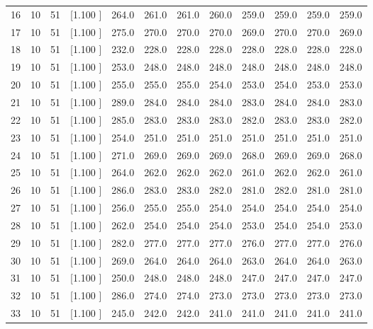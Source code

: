 \documentclass[12pt,a4paper]{article}
\begin{document}
\begin{center}
{\begin{tabular}{r r r r r r r r r r r r}
  16& 10& 51&[1.100     ]&   264.0&   261.0&   261.0&   260.0&   259.0&   259.0&   259.0&   259.0\\[-0.02in]
  17& 10& 51&[1.100     ]&   275.0&   270.0&   270.0&   270.0&   269.0&   270.0&   270.0&   269.0\\[-0.02in]
  18& 10& 51&[1.100     ]&   232.0&   228.0&   228.0&   228.0&   228.0&   228.0&   228.0&   228.0\\[-0.02in]
  19& 10& 51&[1.100     ]&   253.0&   248.0&   248.0&   248.0&   248.0&   248.0&   248.0&   248.0\\[-0.02in]
  20& 10& 51&[1.100     ]&   255.0&   255.0&   255.0&   254.0&   253.0&   254.0&   253.0&   253.0\\[-0.02in]
  21& 10& 51&[1.100     ]&   289.0&   284.0&   284.0&   284.0&   283.0&   284.0&   284.0&   283.0\\[-0.02in]
  22& 10& 51&[1.100     ]&   285.0&   283.0&   283.0&   283.0&   282.0&   283.0&   283.0&   282.0\\[-0.02in]
  23& 10& 51&[1.100     ]&   254.0&   251.0&   251.0&   251.0&   251.0&   251.0&   251.0&   251.0\\[-0.02in]
  24& 10& 51&[1.100     ]&   271.0&   269.0&   269.0&   269.0&   268.0&   269.0&   269.0&   268.0\\[-0.02in]
  25& 10& 51&[1.100     ]&   264.0&   262.0&   262.0&   262.0&   261.0&   262.0&   262.0&   261.0\\[-0.02in]
  26& 10& 51&[1.100     ]&   286.0&   283.0&   283.0&   282.0&   281.0&   282.0&   281.0&   281.0\\[-0.02in]
  27& 10& 51&[1.100     ]&   256.0&   255.0&   255.0&   254.0&   254.0&   254.0&   254.0&   254.0\\[-0.02in]
  28& 10& 51&[1.100     ]&   262.0&   254.0&   254.0&   254.0&   253.0&   254.0&   254.0&   253.0\\[-0.02in]
  29& 10& 51&[1.100     ]&   282.0&   277.0&   277.0&   277.0&   276.0&   277.0&   277.0&   276.0\\[-0.02in]
  30& 10& 51&[1.100     ]&   269.0&   264.0&   264.0&   264.0&   263.0&   264.0&   264.0&   263.0\\[-0.02in]
  31& 10& 51&[1.100     ]&   250.0&   248.0&   248.0&   248.0&   247.0&   247.0&   247.0&   247.0\\[-0.02in]
  32& 10& 51&[1.100     ]&   286.0&   274.0&   274.0&   273.0&   273.0&   273.0&   273.0&   273.0\\[-0.02in]
  33& 10& 51&[1.100     ]&   245.0&   242.0&   242.0&   241.0&   241.0&   241.0&   241.0&   241.0\\[-0.02in]

\end{tabular}}
\end{center}
\end{document}
